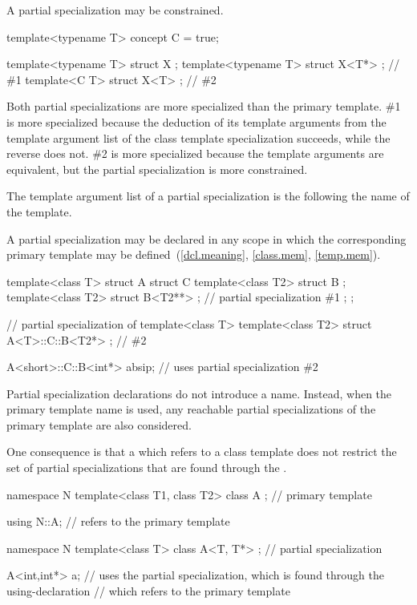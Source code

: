 \pnum
A partial specialization may be constrained.
\begin{example}
\begin{codeblock}
template<typename T> concept C = true;

template<typename T> struct X { };
template<typename T> struct X<T*> { };          // \#1
template<C T> struct X<T> { };                  // \#2
\end{codeblock}
Both partial specializations are more specialized than the primary template.
\#1 is more specialized because the deduction of its template arguments
from the template argument list of the class template specialization succeeds,
while the reverse does not.
\#2 is more specialized because the template arguments are equivalent,
but the partial specialization is more constrained.
\end{example}

\pnum
The template argument list of a partial specialization is
the  following the name of the template.

\pnum
A partial specialization may be declared in any
scope in which the corresponding primary template
may be defined~(\ref{dcl.meaning}, \ref{class.mem}, \ref{temp.mem}).
\begin{example}
\begin{codeblock}
template<class T> struct A {
  struct C {
    template<class T2> struct B { };
    template<class T2> struct B<T2**> { };      // partial specialization \#1
  };
};

// partial specialization of 
template<class T> template<class T2>
  struct A<T>::C::B<T2*> { };                   // \#2

A<short>::C::B<int*> absip;                     // uses partial specialization \#2
\end{codeblock}
\end{example}

\pnum
Partial specialization declarations do not introduce a name.
Instead, when the primary template name is used, any reachable partial
specializations of the primary template are also considered.
\begin{note}
One consequence is
that a 
which refers to a class template does not restrict the set of partial specializations
that are found through the .
\end{note}
\begin{example}
\begin{codeblock}
namespace N {
  template<class T1, class T2> class A { };     // primary template
}

using N::A;                                     // refers to the primary template

namespace N {
  template<class T> class A<T, T*> { };         // partial specialization
}

A<int,int*> a;      // uses the partial specialization, which is found through the using-declaration
                    // which refers to the primary template
\end{codeblock}
\end{example}

